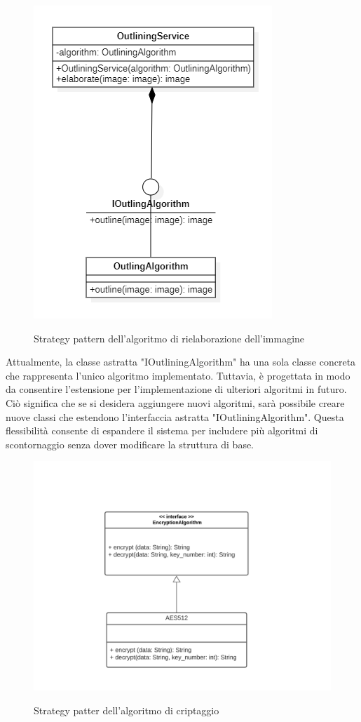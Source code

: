 \begin{figure}[H]
    \centering
    \includegraphics[scale = 1.0]{img/outlineStrategy.png}\\
    \caption{Strategy pattern dell'algoritmo di rielaborazione dell'immagine}
\end{figure}

Attualmente, la classe astratta "IOutliningAlgorithm" ha una sola classe concreta che rappresenta l'unico algoritmo implementato. Tuttavia, è progettata in modo da consentire l'estensione per l'implementazione di ulteriori 
algoritmi in futuro. Ciò significa che se si desidera aggiungere nuovi algoritmi, 
sarà possibile creare nuove classi che estendono l'interfaccia astratta "IOutliningAlgorithm". 
Questa flessibilità consente di espandere il sistema per includere più algoritmi di scontornaggio senza dover 
modificare la struttura di base.

\begin{figure}[H]
    \centering
    \includegraphics[scale = 1.0]{img/criptStrategy.png}\\
    \caption{Strategy patter dell'algoritmo di criptaggio}
\end{figure}

